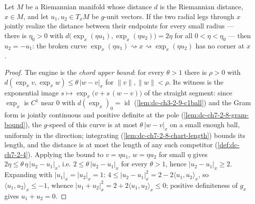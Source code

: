 \begin{lemma}
  \label{lem:dc-ch3-3-9-corner}
  \leanok
  Let $M$ be a Riemannian manifold whose distance $d$ is the Riemannian
  distance, $x\in M$, and let $u_1,u_2\in T_xM$ be $g$-unit vectors. If the
  two radial legs through $x$ jointly realize the distance between their
  endpoints for every small radius — there is $\eta_0>0$ with
  $d\big(\exp_x(\eta u_1),\exp_x(\eta u_2)\big)=2\eta$ for all
  $0<\eta<\eta_0$ — then $u_2=-u_1$: the broken curve
  $\exp_x(\eta u_1)\rightsquigarrow x\rightsquigarrow\exp_x(\eta u_2)$ has no
  corner at $x$.
\end{lemma}
\begin{proof}
  \sketch
  \leanok
  The engine is the \emph{chord upper bound}: for every $\theta>1$ there
  is $\rho>0$ with $d(\exp_x v,\exp_x w)\le\theta\,|w-v|_x$ for
  $\|v\|,\|w\|<\rho$. Its witness is the exponential image
  $s\mapsto\exp_x\big(v+s\,(w-v)\big)$ of the straight segment: since
  $\exp_x$ is $C^1$ near $0$ with $d(\exp_x)_0=\operatorname{id}$
  (\cref{lem:dc-ch3-2-9-c1ball}) and the Gram form is jointly continuous
  and positive definite at the pole (\cref{lem:dc-ch7-2-8-gram-bound}), the
  $g$-speed of this curve is at most $\theta\,|w-v|_x$ on a small enough
  ball, uniformly in the direction; integrating
  (\cref{lem:dc-ch7-2-8-chart-length}) bounds its length, and the distance
  is at most the length of any such competitor (\cref{def:dc-ch7-2-4}).
  Applying the bound to $v=\eta u_1$, $w=\eta u_2$ for small $\eta$ gives
  $2\eta\le\theta\,\eta\,|u_2-u_1|_x$, i.e. $2\le\theta\,|u_2-u_1|_x$ for
  every $\theta>1$, hence $|u_2-u_1|_x\ge2$. Expanding with
  $|u_1|_x=|u_2|_x=1$:
  $4\le|u_2-u_1|_x^2=2-2\langle u_1,u_2\rangle_x$, so
  $\langle u_1,u_2\rangle_x\le-1$, whence
  $|u_1+u_2|_x^2=2+2\langle u_1,u_2\rangle_x\le0$; positive definiteness of
  $g_x$ gives $u_1+u_2=0$.
\end{proof}

